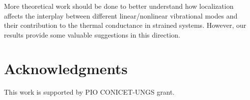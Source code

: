\documentclass[12pt]{article}
\begin{document}
More theoretical work should be done to better understand how  localization affects the interplay between different linear/nonlinear vibrational modes and their contribution to the thermal conductance in strained systems. However, our results provide some valuable suggestions in this direction.





\section*{Acknowledgments}
This work is supported by PIO CONICET-UNGS grant.


\end{document}

